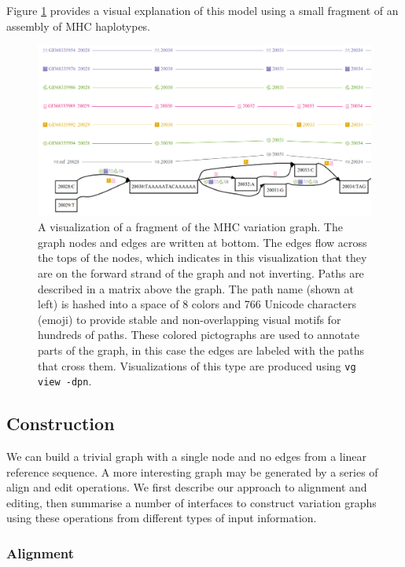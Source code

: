 \documentclass[12pt]{article}
\begin{document}
Figure \ref{fig:minimhc} provides a visual explanation of this model using a small fragment of an assembly of MHC haplotypes.

\begin{figure}[t]
\centering
\includegraphics[width=1.0\textwidth]{figures/minimhc}
\caption{\label{fig:minimhc}
  A visualization of a fragment of the MHC variation graph.
  The graph nodes and edges are written at bottom. The edges flow across the tops of the nodes, which indicates in this visualization that they are on the forward strand of the graph and not inverting.
  Paths are described in a matrix above the graph.
  The path name (shown at left) is hashed into a space of 8 colors and 766 Unicode characters (emoji) to provide stable and non-overlapping visual motifs for hundreds of paths.
  These colored pictographs are used to annotate parts of the graph, in this case the edges are labeled with the paths that cross them.
  Visualizations of this type are produced using {\tt vg view -dpn}.
}
\end{figure}

\subsection{Construction}

We can build a trivial graph with a single node and no edges from a linear reference sequence.
A more interesting graph may be generated by a series of align and edit operations.
We first describe our approach to alignment and editing, then summarise a number of interfaces to construct variation graphs using these operations from different types of input information.

\subsubsection{Alignment}
\end{document}
